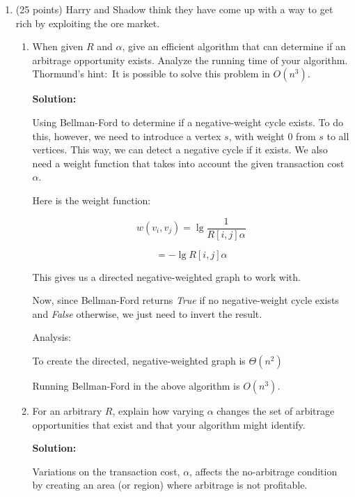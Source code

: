 \documentclass{article}
\begin{document}
\begin{enumerate}
    \item (25 points) Harry and Shadow think they have come up with a way to get rich by exploiting the ore market.
	    \begin{enumerate}
            \item When given $R$ and $\alpha$, give an efficient algorithm that can determine if an arbitrage opportunity exists. 
            Analyze the running time of your algorithm.
	        Thormund's hint:\ It is possible to solve this problem in $O(n^{3})$.\par
            \textbf{Solution:}\par
                Using Bellman-Ford to determine if a negative-weight cycle exists. To do this, however, we need to introduce
                a vertex $s$, with weight $0$ from $s$ to all vertices. This way, we can detect a negative cycle if it exists. We also need a weight function that takes into
                account the given transaction cost $\alpha$.\par
                Here is the weight function: \par
                $$w(v_i, v_j) = \lg \frac{1}{R[i, j]\alpha }$$ \par 
                $$= -\lg R[i, j]\alpha $$\par
                This gives us a directed negative-weighted graph to work with\cite{dailycodingproblem}.\par
                Now, since Bellman-Ford returns \textit{True} if no negative-weight cycle exists and \textit{False} otherwise, we just need to invert the result.\par
                Analysis:\par
                To create the directed, negative-weighted graph is $\Theta(n^2)$\par
                Running Bellman-Ford in the above algorithm is $O(n^{3})$.\cite{cs.princeton}
            \item For an arbitrary $R$, explain how varying $\alpha$ changes the set of arbitrage opportunities that exist and that your 
            algorithm might identify.\par
            \textbf{Solution:}\par
            Variations on the transaction cost, $\alpha$, affects the no-arbitrage condition by creating an area (or region) where arbitrage is not profitable.\cite{semantic}
        \end{enumerate}        
    \pagebreak
	

\end{enumerate}
\end{document}
